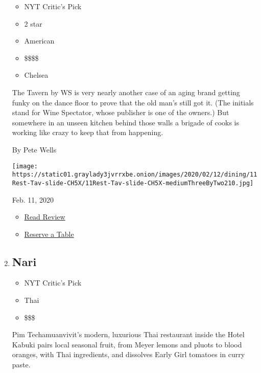 \begin{enumerate}
  \begin{itemize}
  \tightlist
  \item
    NYT Critic's Pick
  \item
     2 star
  \item
    American
  \item
    \$\$\$\$
  \item
    Chelsea
  \end{itemize}

  The Tavern by WS is very nearly another case of an aging brand getting
  funky on the dance floor to prove that the old man's still got it.
  (The initials stand for Wine Spectator, whose publisher is one of the
  owners.) But somewhere in an unseen kitchen behind those walls a
  brigade of cooks is working like crazy to keep that from happening.

  By Pete Wells

  \texttt{[image: https://static01.graylady3jvrrxbe.onion/images/2020/02/12/dining/11Rest-Tav-slide-CH5X/11Rest-Tav-slide-CH5X-mediumThreeByTwo210.jpg]}

  Feb. 11, 2020

  \begin{itemize}
  \tightlist
  \item
    \href{https://www.nytimes3xbfgragh.onion/2020/02/11/dining/tavern-by-ws-review-pete-wells.html?rref=collection\%2Fcollection\%2Frestaurant-guide}{Read
    Review}
  \item
    \href{https://resy.com/cities/ny/tavern-by-ws?utm_source=nyt\&utm_medium=restoprofile\&utm_campaign=affiliates\&aff_id=c1fe784}{Reserve
    a Table}
  \end{itemize}
\item
  \href{https://www.nytimes3xbfgragh.onion/2020/02/11/dining/nari-review-tejal-rao.html}{}

  \hypertarget{nari}{%
  \subsection{Nari}\label{nari}}

  \begin{itemize}
  \tightlist
  \item
    NYT Critic's Pick
  \item
    Thai
  \item
    \$\$\$
  \end{itemize}

  Pim Techamuanvivit's modern, luxurious Thai restaurant inside the
  Hotel Kabuki pairs local seasonal fruit, from Meyer lemons and pluots
  to blood oranges, with Thai ingredients, and dissolves Early Girl
  tomatoes in curry paste.


\end{enumerate}
